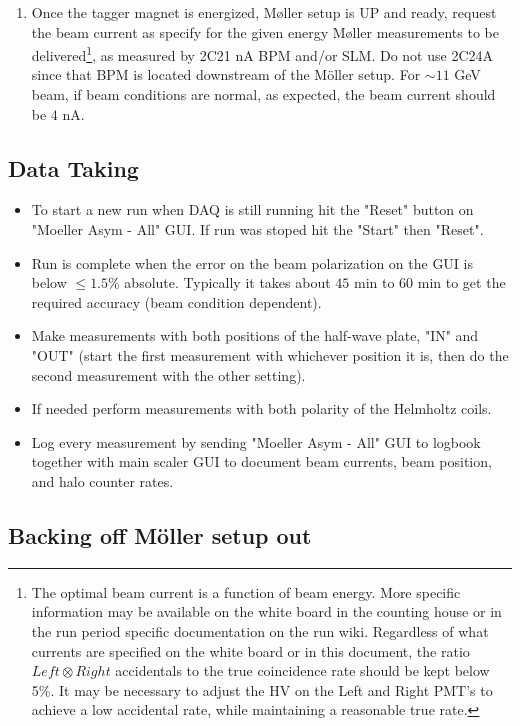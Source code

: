 \begin{enumerate}
\begin{enumerate}
\end{enumerate}
%

\item Once the tagger magnet is energized, M{\o}ller setup is UP and ready, request the beam current as specify for the given energy M{\o}ller measurements to be delivered\footnote{The optimal beam current is a function of beam energy.
More specific information may be available on the white board in the
counting house or in the run period specific documentation on the run wiki. Regardless
of what currents are specified on the white board or in this document,
the ratio $Left\otimes Right$ accidentals to the true coincidence
rate should be kept below 5\%. It may be necessary to adjust the
HV on the Left and Right PMT's to achieve a low accidental rate, while
maintaining a reasonable true rate.}, 
as measured by 2C21 nA BPM and/or SLM. Do
not use 2C24A since that BPM is located downstream of the M{\"o}ller setup. For $\sim 11$ GeV beam, if beam conditions are normal, as expected, the beam current should be $4$ nA. 

\end{enumerate}

\subsection{Data Taking}
\indent
\begin{itemize}
\item 
To start a new run when DAQ is still running hit the "Reset" button on "Moeller Asym - All" GUI. If run was stoped hit the "Start" then "Reset". 
\item Run is complete when the error on the beam polarization on the GUI is below $\le 1.5\%$ absolute. Typically it takes about $45$ min to $60$ min to get the required accuracy (beam condition dependent). 
\item Make measurements with both positions of the half-wave plate,  "IN" and "OUT" (start the first measurement with whichever position it is, then do the second measurement with the other setting). 
\item If needed perform measurements with both polarity of the Helmholtz coils. 
\item Log every measurement by sending "Moeller Asym - All" GUI to logbook together with main scaler GUI to document beam currents, beam position, and halo counter rates. 
\end{itemize}

\subsection{Backing off M{\"o}ller setup out\label{moller close out}}

